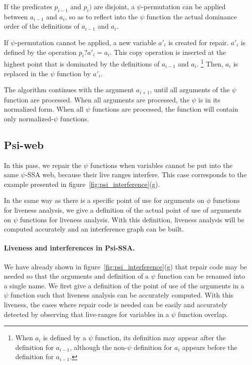 If the predicates ${p_{i-1}}$ and ${p_i})$ are disjoint, a
$\psi$-permutation can be applied between ${a_{i-1}}$ and ${
  a_i}$, so as to reflect into the $\psi$ function the actual
dominance order of the definitions of ${a_{i-1}}$ and ${a_i}$.

If $\psi$-permutation cannot be applied, a new variable ${a'_i}$
is created for repair. ${a'_i}$ is defined by the operation ${
  p_i? a'_i = a_i}$. This copy operation is inserted at the highest
point that is dominated by the definitions of ${a_{i-1}}$ and
${a_i}$.
\footnote{When ${a_i}$ is defined by a $\psi$ function, its
  definition may appear after the definition for ${a_{i-1}}$,
  although the non-$\psi$ definition for ${a_i}$ appears before
  the definition for ${a_{i-1}}$.}
Then, ${a_i}$ is replaced in the $\psi$ function by ${a'_i}$.

The algorithm continues with the argument ${a_{i+1}}$, until all
arguments of the $\psi$ function are processed. When all arguments
are processed, the $\psi$ is in its normalized form. When all $\psi$
functions are processed, the function will contain only
normalized-$\psi$ functions.


\subsection{Psi-web}

In this pass, we repair the $\psi$ functions when variables cannot be
put into the same $\psi$-SSA web, because their live ranges
interfere. This case corresponds to the example presented in
figure~\ref{fig:psi_interference}(g).

In the same way as there is a specific point of use for arguments on
$\phi$ functions for liveness analysis, we give a definition of the
actual point of use of arguments on $\psi$ functions for liveness
analysis. With this definition, liveness analysis will be computed
accurately and an interference graph can be built.

\paragraph{Liveness and interferences in Psi-SSA.}
We have already shown in figure~\ref{fig:psi_interference}(g) that
repair code may be needed so that the arguments and definition of a
$\psi$ function can be renamed into a single name. We first give a
definition of the point of use of the arguments in a $\psi$ function
such that liveness analysis can be accurately computed. With this
liveness, the cases where repair code is needed can be easily and
accurately detected by observing that live-ranges for variables in a
$\psi$ function overlap.

